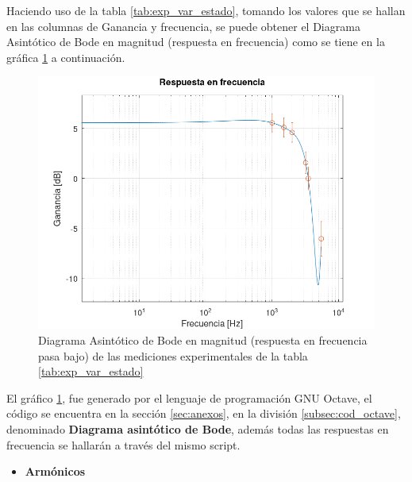 \begin{itemize}
            Haciendo uso de la tabla \ref{tab:exp_var_estado}, tomando los valores que se hallan en las columnas de Ganancia y frecuencia, se puede obtener el Diagrama  Asintótico de Bode en magnitud (respuesta en frecuencia) como se tiene en la gráfica \ref{fig:resp_frec_var_estado} a continuación.

             \begin{figure}[H]
                \centering
                \renewcommand{\figurename}{Gráfica}
                \setcounter{figure}{37}
                \includegraphics[width=15cm]{Imagenes/resp_frec_var_estado.png}
                \caption{Diagrama  Asintótico de Bode en magnitud (respuesta en frecuencia pasa bajo) de las mediciones experimentales de la tabla \ref{tab:exp_var_estado}}
                \label{fig:resp_frec_var_estado}
            \end{figure}

            El gráfico \ref{fig:resp_frec_var_estado}, fue generado por el lenguaje de programación GNU Octave, el código se encuentra en la sección \ref{sec:anexos}, en la división \ref{subsec:cod_octave}, denominado \textbf{Diagrama asintótico de Bode}, además todas las respuestas en frecuencia se hallarán a través del mismo script.
            \begin{itemize}
                \item \textbf{Armónicos}


\end{itemize}
\end{itemize}
